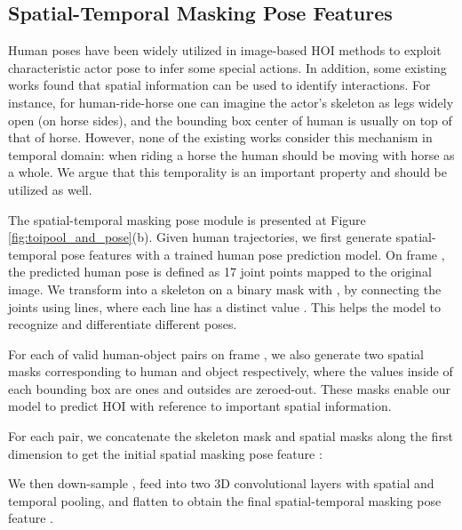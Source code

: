 \documentclass[sigconf]{acmart}
\begin{document}
\subsection{Spatial-Temporal Masking Pose Features}
\label{subsec:spaital_temporal_human_poses}

Human poses have been widely utilized in image-based HOI methods \cite{li2019transferable,gupta2019no,wan2019pose} to exploit characteristic actor pose to infer some special actions.
In addition, some existing works \cite{wang2019deep,wan2019pose} found that spatial information can be used to identify interactions.
For instance, for {\selectfont human-ride-horse} one can imagine the actor's skeleton as legs widely open (on horse sides), and the bounding box center of {\selectfont human} is usually on top of that of {\selectfont horse}.
However, none of the existing works consider this mechanism in temporal domain: when riding a horse the {\selectfont human} should be moving with {\selectfont horse} as a whole.
We argue that this temporality is an important property and should be utilized as well.


The spatial-temporal masking pose module is presented at Figure \ref{fig:toipool_and_pose}(b).
Given  human trajectories, we first generate  spatial-temporal pose features with a trained human pose prediction model.
On frame , the predicted human pose  is defined as 17 joint points mapped to the original image.
We transform  into a skeleton on a binary mask with , by connecting the joints using lines, where each line has a distinct value . 
This helps the model to recognize and differentiate different poses.

For each of  valid human-object pairs on frame , we also generate two spatial masks  corresponding to human and object respectively, where the values inside of each bounding box are ones and outsides are zeroed-out.
These masks enable our model to predict HOI with reference to important spatial information.

For each pair, we concatenate the skeleton mask  and spatial masks  along the first dimension to get the initial spatial masking pose feature :

We then down-sample , feed into two 3D convolutional layers with spatial and temporal pooling, and flatten to obtain the final spatial-temporal masking pose feature .
\end{document}
